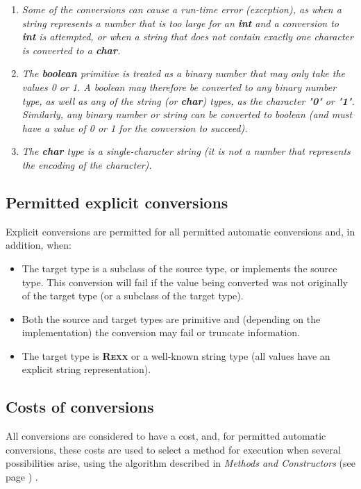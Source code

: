 \begin{enumerate}
\item \emph{Some of the conversions can cause a run-time error (exception), as
when a string represents a number that is too large for an \textbf{int}
and a conversion to \textbf{int} is attempted, or when a string that
does not contain exactly one character is converted to a
\textbf{char}.}
\item 
\emph{The \textbf{boolean} primitive is treated as a binary number that may
only take the values 0 or 1.
A boolean may therefore be converted to
any binary number type, as well as any of the string
(or \textbf{char}) types, as the character "\textbf{0}" or
"\textbf{1}".
Similarly, any binary number or string can be converted to boolean (and
must have a value of 0 or 1 for the conversion to succeed).}
\item 
\emph{The \textbf{char} type is a single-character string (it is not a
number that represents the encoding of the character).}
\end{enumerate}
\subsection{Permitted explicit conversions}
 
Explicit conversions are permitted for all permitted automatic
conversions and, in addition, when:
\begin{itemize}
\item 
The target type is a subclass of the source type, or implements
the source type.
This conversion will fail if the value being converted was not
originally of the target type (or a subclass of the target type).
\item 
Both the source and target types are primitive and (depending on the
implementation) the conversion may fail or truncate information.
\item 
The target type is \textbf{R\textsc{exx}} or a well-known string type (all
values have an explicit string representation).
\end{itemize}
\subsection{Costs of conversions}\label{refcosts}
 
All conversions are considered to have a cost, and, for permitted
automatic conversions, these costs are used to select a method for
execution when several possibilities arise, using the algorithm
described in  \emph{Methods and Constructors} (see page \pageref{refsmeth}) .
 
